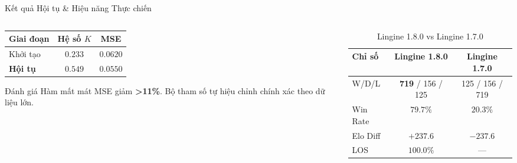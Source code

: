 \begin{frame}{Kết quả Hội tụ \& Hiệu năng Thực chiến}
    \begin{columns}[T]
        \begin{column}{0.3\textwidth}
            {\small
            \begin{tabular}{lcc}
                \toprule
                \textbf{Giai đoạn} & \textbf{Hệ số $K$} & \textbf{MSE} \\ \midrule
                Khởi tạo & $0.233$ & $0.0620$ \\ 
                \textbf{Hội tụ} & $\mathbf{0.549}$ & $\mathbf{0.0550}$ \\
                \bottomrule
            \end{tabular}
            }
            \pause
            \begin{alertblock}{Đánh giá}
                Hàm mất mát MSE giảm \textbf{>11\%}. Bộ tham số tự hiệu chỉnh chính xác theo dữ liệu lớn.
            \end{alertblock}
        \end{column}
        \pause
        \begin{column}{0.5\textwidth}
            {\small
            \begin{table}
                \begin{tabular}{lcc}
                    \toprule
                    \textbf{Chỉ số} & \textbf{Lingine 1.8.0} & \textbf{Lingine 1.7.0} \\ \midrule
                    W/D/L & \textbf{719} / 156 / 125 & 125 / 156 / 719 \\ 
                    Win Rate & $\mathbf{79.7\%}$ & $20.3\%$ \\ \midrule
                    Elo Diff & $\mathbf{+237.6}$ & $-237.6$ \\ 
                    LOS & $\mathbf{100.0\%}$ & — \\
                    \bottomrule
                \end{tabular}
                \caption{Lingine 1.8.0 vs Lingine 1.7.0}
            \end{table}
            }
        \end{column}
    \end{columns}
\end{frame}
